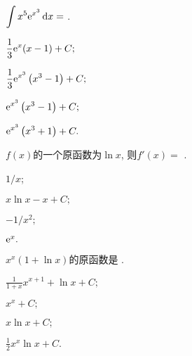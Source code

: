 \begin{problem} $\displaystyle \int x^{5}\mathrm{e}^{x^{3}}\mathop{}\!\mathrm{d} x =$ .

\begin{abcd} 
	
\item $\displaystyle \frac{1}{3}\mathrm{e}^{x}(x - 1) + C; $

\item $\displaystyle \frac{1}{3}\mathrm{e}^{x^{3}}\left( x^{3} - 1 \right) + C; $

\item $\displaystyle \mathrm{e}^{x^{3}}\left( x^{3} - 1 \right) + C; $

\item $\displaystyle \mathrm{e}^{x^{3}}\left( x^{3} + 1 \right) + C.$

\end{abcd}

\end{problem}           

\begin{problem} $f(x)$的一个原函数为$\ln x$, 则$f'(x) =$ .

\begin{abcd} \item$1/x$;

\item $x\ln x - x + C; $

\item $- 1/x^{2}; $

\item $\mathrm{e}^{x}.$

\end{abcd}

\end{problem}           

\begin{problem} $x^{x}(1 + \ln x)$的原函数是 .

\begin{abcd} 
	
\item $\displaystyle \frac{1}{1 + x}x^{x + 1} + \ln x + C; $

\item $x^{x} + C; $

\item $x\ln x + C; $

\item $\displaystyle \frac{1}{2}x^{x}\ln x + C.$

\end{abcd}

\end{problem}           


